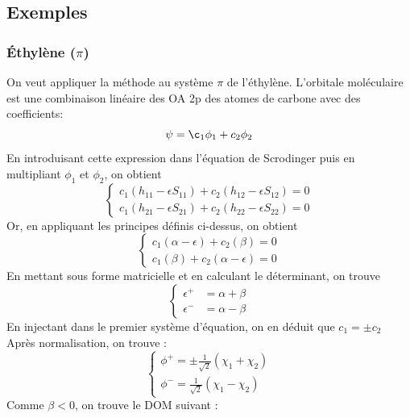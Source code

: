 \documentclass[french]{yLectureNote}
\begin{document}
\subsection{Exemples}
\subsubsection{Éthylène ($\pi$)}
On veut appliquer la méthode au système \(\pi\) de l'éthylène. L'orbitale moléculaire est une combinaison linéaire des OA 2p des atomes de carbone avec des coefficients: \[\psi = \c_1\phi_1+c_2\phi_2\]
En introduisant cette expression dans l'équation de Scrodinger puis en multipliant \(\phi_1\) et \(\phi_2\), on obtient \[ \left\{\begin{matrix}
c_1(h_{11}-\epsilon S_{11}) + c_2(h_{12}-\epsilon S_{12}) = 0\\
c_1(h_{21}-\epsilon S_{21}) + c_2(h_{22}-\epsilon S_{22}) = 0
\end{matrix}\right.\] Or, en appliquant les principes définis ci-dessus, on obtient
\[ \left\{\begin{matrix}
c_1(\alpha-\epsilon) + c_2(\beta) = 0\\
c_1(\beta) + c_2(\alpha-\epsilon ) = 0
\end{matrix}\right.\]
En mettant sous forme matricielle et en calculant le déterminant, on trouve \[ \left\{\begin{matrix}
\epsilon^+ &=\alpha+\beta\\
\epsilon^-&=\alpha-\beta
\end{matrix}\right.\]
En injectant dans le premier système d'équation, on en déduit que \(c_1 = \pm c_2\) Après normalisation, on trouve :
\[ \left\{\begin{matrix}
\phi^+ = \pm \frac{1}{\sqrt{2}}(\chi_1+\chi_2)\\
\phi^- = \frac{1}{\sqrt{2}}(\chi_1-\chi_2)
\end{matrix}\right.\]
Comme \(\beta <0\), on trouve le DOM suivant :
\end{document}
